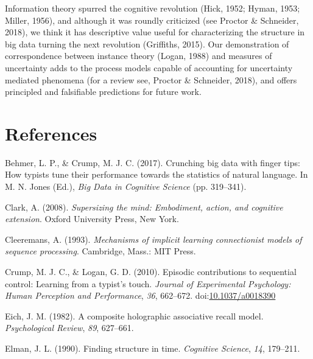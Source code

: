 \documentclass[,man,floatsintext]{apa6}
\begin{document}
Information theory spurred the cognitive revolution (Hick, 1952; Hyman, 1953; Miller, 1956), and although it was roundly criticized (see Proctor \& Schneider, 2018), we think it has descriptive value useful for characterizing the structure in big data turning the next revolution (Griffiths, 2015). Our demonstration of correspondence between instance theory (Logan, 1988) and measures of uncertainty adds to the process models capable of accounting for uncertainty mediated phenomena (for a review see, Proctor \& Schneider, 2018), and offers principled and falsifiable predictions for future work.

\newpage

\hypertarget{references}{%
\section{References}\label{references}}

\begingroup
\setlength{\parindent}{-0.5in}
\setlength{\leftskip}{0.5in}

\hypertarget{refs}{}
\leavevmode\hypertarget{ref-behmer_crunching_2017}{}%
Behmer, L. P., \& Crump, M. J. C. (2017). Crunching big data with finger tips: How typists tune their performance towards the statistics of natural language. In M. N. Jones (Ed.), \emph{Big Data in Cognitive Science} (pp. 319--341).

\leavevmode\hypertarget{ref-clark_supersizing_2008}{}%
Clark, A. (2008). \emph{Supersizing the mind: Embodiment, action, and cognitive extension}. Oxford University Press, New York.

\leavevmode\hypertarget{ref-cleeremans_mechanisms_1993}{}%
Cleeremans, A. (1993). \emph{Mechanisms of implicit learning connectionist models of sequence processing}. Cambridge, Mass.: MIT Press.

\leavevmode\hypertarget{ref-crump_episodic_2010}{}%
Crump, M. J. C., \& Logan, G. D. (2010). Episodic contributions to sequential control: Learning from a typist's touch. \emph{Journal of Experimental Psychology: Human Perception and Performance}, \emph{36}, 662--672. doi:\href{https://doi.org/10.1037/a0018390}{10.1037/a0018390}

\leavevmode\hypertarget{ref-eich_composite_1982}{}%
Eich, J. M. (1982). A composite holographic associative recall model. \emph{Psychological Review}, \emph{89}, 627--661.

\leavevmode\hypertarget{ref-elman_finding_1990}{}%
Elman, J. L. (1990). Finding structure in time. \emph{Cognitive Science}, \emph{14}, 179--211.
\end{document}
